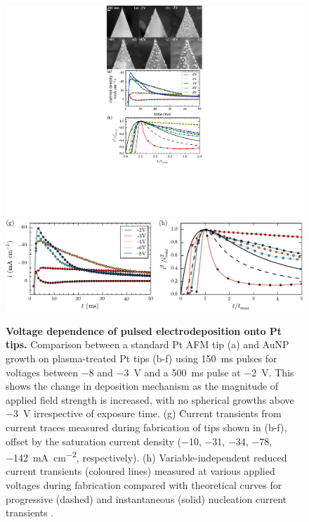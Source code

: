 \documentclass{article}
\begin{document}
\begin{figure}[bt]
\centering
\includegraphics{figures/tip_voltage_dependence}\\
\includegraphics{figures/current_transients}
\caption[Voltage dependence of pulsed electrodeposition onto Pt tips]{\textbf{Voltage dependence of pulsed electrodeposition onto Pt tips.} Comparison between a standard Pt AFM tip (a) and AuNP growth on plasma-treated Pt tips (b-f) using \SI{150}{ms} pulses for voltages between \num{-8} and \SI{-3}{V} and a \SI{500}{ms} pulse at \SI{-2}{V}. This shows the change in deposition mechanism as the magnitude of applied field strength is increased, with no spherical growths above \SI{-3}{V} irrespective of exposure time. (g) Current transients from current traces measured during fabrication of tips shown in (b-f), offset by the saturation current density (\num{-10}, \num{-31}, \num{-34}, \num{-78}, \SI{-142}{\milli\ampere\per\centi\metre\squared}, respectively). (h) Variable-independent reduced current transients (coloured lines) measured at various applied voltages during fabrication compared with theoretical curves for progressive (dashed) and instantaneous (solid) nucleation current transients \cite{scharifker1983}.}
\label{fig:electrochemical_voltage_dependence}
\end{figure}
\end{document}
